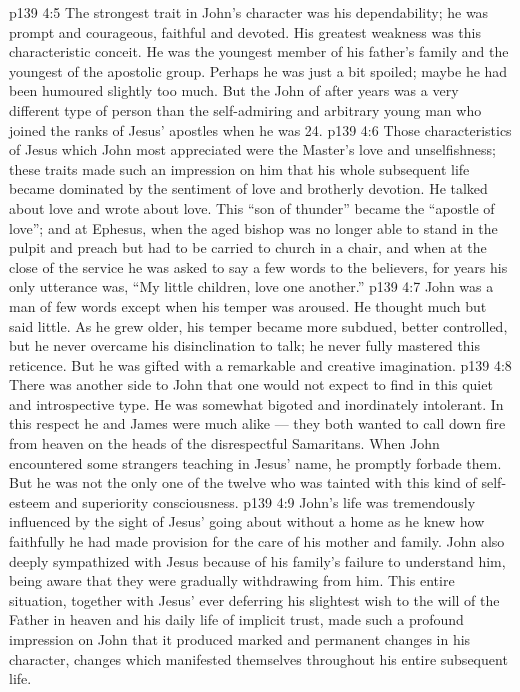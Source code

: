 \vs p139 4:5 The strongest trait in John’s character was his dependability; he was prompt and courageous, faithful and devoted. His greatest weakness was this characteristic conceit. He was the youngest member of his father’s family and the youngest of the apostolic group. Perhaps he was just a bit spoiled; maybe he had been humoured slightly too much. But the John of after years was a very different type of person than the self\hyp{}admiring and arbitrary young man who joined the ranks of Jesus’ apostles when he was 24.
\vs p139 4:6 \pc Those characteristics of Jesus which John most appreciated were the Master’s love and unselfishness; these traits made such an impression on him that his whole subsequent life became dominated by the sentiment of love and brotherly devotion. He talked about love and wrote about love. This “son of thunder” became the “apostle of love”; and at Ephesus, when the aged bishop was no longer able to stand in the pulpit and preach but had to be carried to church in a chair, and when at the close of the service he was asked to say a few words to the believers, for years his only utterance was, “My little children, love one another.”
\vs p139 4:7 \pc John was a man of few words except when his temper was aroused. He thought much but said little. As he grew older, his temper became more subdued, better controlled, but he never overcame his disinclination to talk; he never fully mastered this reticence. But he was gifted with a remarkable and creative imagination.
\vs p139 4:8 \pc There was another side to John that one would not expect to find in this quiet and introspective type. He was somewhat bigoted and inordinately intolerant. In this respect he and James were much alike --- they both wanted to call down fire from heaven on the heads of the disrespectful Samaritans. When John encountered some strangers teaching in Jesus’ name, he promptly forbade them. But he was not the only one of the twelve who was tainted with this kind of self\hyp{}esteem and superiority consciousness.
\vs p139 4:9 John’s life was tremendously influenced by the sight of Jesus’ going about without a home as he knew how faithfully he had made provision for the care of his mother and family. John also deeply sympathized with Jesus because of his family’s failure to understand him, being aware that they were gradually withdrawing from him. This entire situation, together with Jesus’ ever deferring his slightest wish to the will of the Father in heaven and his daily life of implicit trust, made such a profound impression on John that it produced marked and permanent changes in his character, changes which manifested themselves throughout his entire subsequent life.
